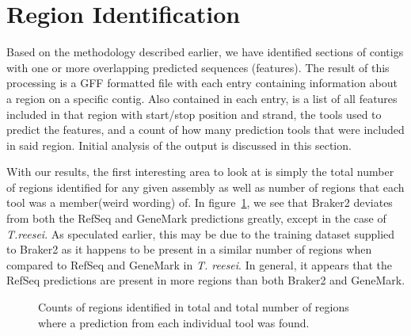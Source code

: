 \section{Region Identification}

Based on the methodology described earlier, we have identified
sections of contigs with one or more overlapping predicted sequences
(features). The result of this processing is a GFF formatted file with
each entry containing information about a region on a specific
contig. Also contained in each entry, is a list of all features
included in that region with start/stop position and strand, the tools
used to predict the features, and a count of how many prediction tools
that were included in said region. Initial analysis of the output is
discussed in this section.

With our results, the first interesting area to look at is simply the
total number of regions identified for any given assembly as well as
number of regions that each tool was a member(weird wording) of. In
figure~\ref{regioncounts}, we see that Braker2 deviates from both the
RefSeq and GeneMark predictions greatly, except in the case of
\textit{T.reesei}. As speculated earlier, this may be due to the
training dataset supplied to Braker2 as it happens to be present in a
similar number of regions when compared to RefSeq and GeneMark in
\textit{T. reesei}. In general, it appears that the RefSeq predictions
are present in more regions than both Braker2 and GeneMark. 

\begin{figure}
  \caption{Counts of regions identified in total and total number of
    regions where a prediction from each individual tool was found.}
  \label{regioncounts}
\end{figure}

